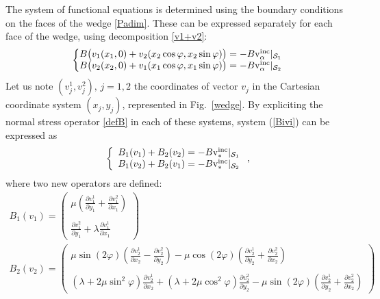 The system of functional equations is determined using the boundary conditions on the faces of the wedge \eqref{Padim}. These can be expressed separately for each face of the wedge, using decomposition \eqref{v1+v2}:
\begin{equation}
\left\{
\begin{matrix}
B \big( v_1(x_1,0)+v_2(x_2 \cos \varphi, x_2 \sin \varphi) \big) = -B \rm v_{\alpha}^{inc}|_{\mathcal{S}_1} \\
B \big( v_2(x_2,0)+v_1(x_1 \cos \varphi, x_1 \sin \varphi) \big) = -B \rm v_{\alpha}^{inc}|_{\mathcal{S}_2}
\end{matrix}
\right.
\label{Bivi}
\end{equation}
Let us note  $(v_j^1,v_j^2),\, j=1,2$ the coordinates of vector $v_j$ in the Cartesian coordinate system $(x_j,y_j)$, represented in Fig.~\ref{wedge}.
By expliciting the normal stress operator \eqref{defB} in each of these systems,  system (\ref{Bivi}) can be expressed as
\begin{equation}
\left\{
\begin{array}{l}
B_1(v_1)+B_2(v_2)=-B\rm v_*^{inc}|_{\mathcal{S}_1} \\
B_1(v_2)+B_2(v_1)=-B\rm v_*^{inc}|_{\mathcal{S}_2}
\end{array}
\right.,
\end{equation}
where two new operators are defined:
\begin{gather}
B_1(v_1)=
\begin{pmatrix}
\mu \left( \frac{\partial v_1^1}{\partial y_1}+\frac{\partial v_1^2}{\partial x_1} \right) \\
~\\
\frac{\partial v_1^2}{\partial y_1}+\lambda \frac{\partial v_1^1}{\partial x_1}
\end{pmatrix} \label{B1v1expl}\\
B_2(v_2)=
\begin{pmatrix}
\mu \sin(2\varphi)\left( \frac{\partial v_2^1}{\partial x_2}-\frac{\partial v_2^2}{\partial y_2}\right)-\mu \cos(2\varphi)  \left( \frac{\partial v_2^1}{\partial y_2}+\frac{\partial v_2^2}{\partial x_2} \right)\\
~\\
(\lambda+2\mu \sin^2\varphi) \frac{\partial v_2^1}{\partial x_2}+(\lambda+2\mu \cos^2 \varphi)\frac{\partial v_2^2}{\partial y_2}-\mu \sin(2\varphi)  \left( \frac{\partial v_2^1}{\partial y_2}+\frac{\partial v_2^2}{\partial x_2} \right)
\end{pmatrix}\label{B2v2expl}
\end{gather}

